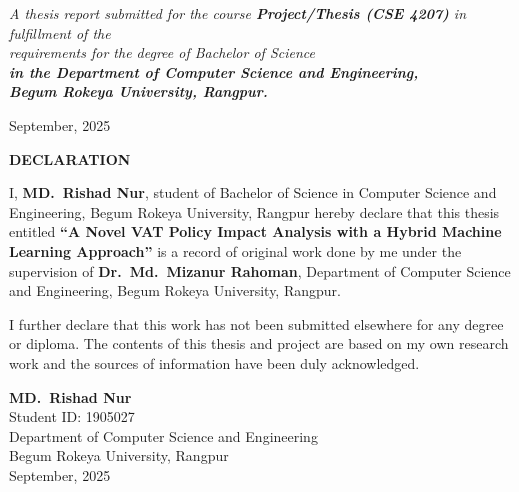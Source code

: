 \begin{titlepage}
        \vspace{1cm}

\textit{A thesis report submitted for the course \textbf{Project/Thesis (CSE 4207)} in fulfillment of the\\
requirements for the degree of Bachelor of Science\\
\textbf{in the Department of Computer Science and Engineering,\\ Begum Rokeya University, Rangpur.}}

\vspace{1cm}
        { \large
            September, 2025
        }
\end{titlepage}
\vspace{10mm}
\newpage
\thispagestyle{empty}
\vspace*{4cm}

\begin{center}
    {\Large\bfseries DECLARATION}
\end{center}

\vspace{1cm}

I, \textbf{MD.\ Rishad Nur}, student of Bachelor of Science in Computer Science and Engineering, Begum Rokeya University, Rangpur hereby declare that this thesis entitled \textbf{``A Novel VAT Policy Impact Analysis with a Hybrid Machine Learning Approach''} is a record of original work done by me under the supervision of \textbf{Dr.\ Md.\ Mizanur Rahoman}, Department of Computer Science and Engineering, Begum Rokeya University, Rangpur.

\vspace{1cm}

I further declare that this work has not been submitted elsewhere for any degree or diploma. The contents of this thesis and project are based on my own research work and the sources of information have been duly acknowledged.

\vspace{3cm}

\begin{flushright}
    \textbf{MD.\ Rishad Nur}\\
    Student ID: 1905027\\
    Department of Computer Science and Engineering\\
    Begum Rokeya University, Rangpur\\
    September, 2025
\end{flushright}

\newpage
\thispagestyle{empty}
\vspace*{2cm}

